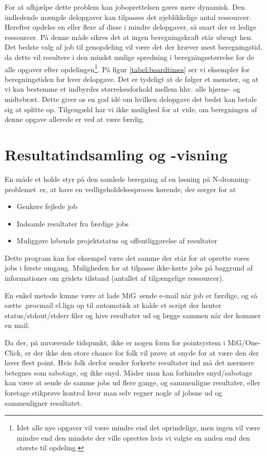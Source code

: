 \documentclass[pdf,draft,a4paper,11pt]{article}
\newcommand{\mig}{MiG}
\newcommand{\oc}{One-Click}
\newcommand{\nq}{N-dronning-problemet}
\begin{document}
For at afhjælpe dette problem kan joboprettelsen gøres mere dynamisk. Den indledende mængde delopgaver kan tilpasses det øjeblikkelige antal ressourcer. Herefter opdeles en eller flere af disse i mindre delopgaver, så snart der er ledige ressourcer. På denne måde sikres det at ingen beregningskraft står ubrugt hen. 
Det bedste valg af job til genopdeling vil være det der kræver mest beregningstid, da dette vil resultere i den mindst mulige spredning i beregningsstørrelse for de alle opgaver efter opdelingen\footnote{Idet alle nye opgaver vil være mindre end det oprindelige, men ingen vil være mindre end den mindste der ville oprettes hvis vi valgte en anden end den største til opdeling.}. På figur \ref{tabel:boardtimes} ser vi eksempler for beregningstiden for hver delopgave. Det er tydeligt at de følger et mønster, og at vi kan bestemme et indbyrdes størrelsesforhold mellem hhv. alle hjørne- og midtebræt. Dette giver os en god idé om hvilken delopgave det bedst kan betale sig at splitte op. Tilgengæld har vi ikke mulighed for at vide, om beregningen af denne opgave allerede er ved at være færdig. 



\section{Resultatindsamling og -visning}

En måde et holde styr på den samlede beregning af en løsning på \nq\ er, at have en vedligeholdelsesproces kørende, der sørger for at 
\begin{itemize}
	\item Genkøre fejlede job
	\item Indsamle resultater fra færdige jobs
	\item Muliggøre løbende projektstatus og offentliggørelse af resultater 
\end{itemize}
Dette program kan for eksempel være det samme der står for at oprette vores jobs i første omgang. Muligheden for at tilpasse ikke-kørte jobs på baggrund af informationer om gridets tilstand (antallet af tilgængelige ressourcer). 


En enkel metode kunne være at lade \mig\ sende e-mail når job er færdige, og så sætte .procmail el.lign op til automatisk at kalde et script der henter status/stdout/stderr filer og hive resultater ud og lægge sammen når der
kommer en mail.

Da der, på nuværende tidspunkt, ikke er nogen form for pointsystem i \mig/\oc,
er der ikke den store chance for folk vil prøve at snyde for at være den der
laver flest point. Hvis folk derfor sender forkerte resultater ind må det
nærmere betegnes som sabotage, og ikke snyd. Måder man kan forhindre
snyd/sabotage kan være at sende de samme jobs ud flere gange, og sammenligne
resultater, eller foretage stikprøve kontrol hvor man selv regner nogle af
jobsne ud og sammenligner resultatet. 
\end{document}
